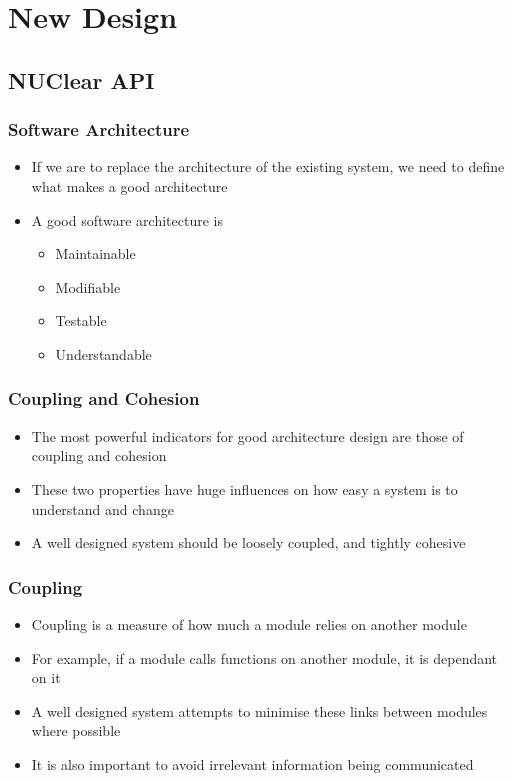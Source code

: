 \documentclass{beamer}
\begin{document}
\section{New Design}
\begin{frame}
	\sectionpage
\end{frame}

\subsection{NUClear API}
\begin{frame}
	\frametitle{Software Architecture}
	\begin{itemize}
		\item If we are to replace the architecture of the existing system, we need to define what makes a good architecture
		\item A good software architecture is
		\begin{itemize}
			\item Maintainable
			\item Modifiable
			\item Testable
			\item Understandable
		\end{itemize}
	\end{itemize}
\end{frame}

\begin{frame}
	\frametitle{Coupling and Cohesion}
	\begin{itemize}
		\item The most powerful indicators for good architecture design are those of coupling and cohesion
		\item These two properties have huge influences on how easy a system is to understand and change
		\item A well designed system should be loosely coupled, and tightly cohesive
	\end{itemize}
\end{frame}

\begin{frame}
	\frametitle{Coupling}
	\begin{itemize}
		\item Coupling is a measure of how much a module relies on another module
		\item For example, if a module calls functions on another module, it is dependant on it
		\item A well designed system attempts to minimise these links between modules where possible
		\item It is also important to avoid irrelevant information being communicated
	\end{itemize}
\end{frame}
\end{document}
